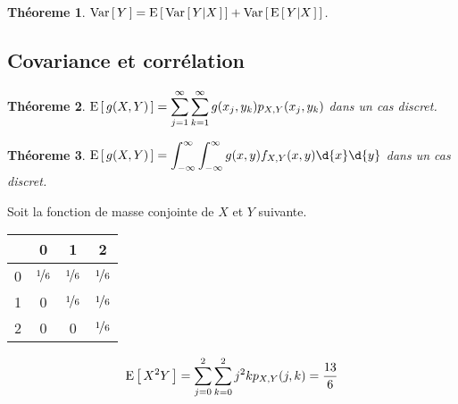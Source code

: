 \documentclass[11pt]{article}
\newcommand\Esp[1]{%
	\ensuremath{%
		\mathrm{E}\left[\,#1\,\right]%
	}%
}%
\newcommand\Espg[2]{%
	\ensuremath{%
		\mathrm{E}\left[\,#1\middle\vert#2\,\right]%
	}%
}%
\newcommand\Var[1]{%
	\ensuremath{%
		\mathrm{Var}\left[\,#1\,\right]%
	}%
}%
\newcommand\Varg[2]{%
	\ensuremath{%
		\mathrm{Var}\left[\,#1\middle\vert#2\,\right]%
	}%
}%
\newtheorem{theoreme}{Théoreme}[section]
\begin{document}
\begin{theoreme}
	$\Var{Y}=\Esp{\Varg{Y}{X}}+\Var{\Espg{Y}{X}}$.
\end{theoreme}

\subsection{Covariance et corrélation}

\begin{theoreme}
	$\Esp{g(X,Y)}=\displaystyle\sum_{j=1}^\infty
	\displaystyle\sum_{k=1}^\infty g(x_j,y_k)p_{X,Y}(x_j,y_k)$
	dans un cas discret.
\end{theoreme}
\begin{theoreme}
	$\Esp{g(X,Y)}=\displaystyle\int_{-\infty}^\infty
	\displaystyle\int_{-\infty}^\infty g(x,y)f_{X,Y}(x,y)\d{x}\d{y}$
	dans un cas discret.
\end{theoreme}

\begin{exemple}
	Soit la fonction de masse conjointe de $X$ et $Y$ suivante.
	\begin{table}[H]
		\centering
		\begin{tabular}{c|ccc}
			  & 0 & 1 & 2\\
			\hline
			0 & $\nicefrac{1}{6}$ & $\nicefrac{1}{6}$ & $\nicefrac{1}{6}$\\
			1 & 0                 & $\nicefrac{1}{6}$ & $\nicefrac{1}{6}$\\
			2 & 0                 & 0                 & $\nicefrac{1}{6}$\\
		\end{tabular}
	\end{table}


	\begin{equation*}
		\Esp{X^2Y}=\sum_{j=0}^2\sum_{k=0}^2j^2kp_{X,Y}(j,k)=\frac{13}{6}
	\end{equation*}
\end{exemple}
\end{document}
